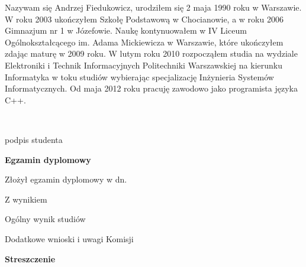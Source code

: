 \begin{titlepage}
    \indent
    Nazywam się Andrzej Fiedukowicz, urodziłem się 2 maja 1990 roku w Warszawie. W roku 2003 ukończyłem Szkołę Podstawową w Chocianowie, a w roku 2006 Gimnazjum nr 1 w Józefowie. Naukę kontynuowałem w IV Liceum Ogólnokształcącego im. Adama Mickiewicza w Warszawie, które ukończyłem zdając maturę w 2009 roku. W lutym roku 2010 rozpocząłem studia na wydziale Elektroniki i Technik Informacyjnych Politechniki Warszawskiej na kierunku Informatyka w toku studiów wybierając specjalizację Inżynieria Systemów Informatycznych. Od maja 2012 roku pracuję zawodowo jako programista języka C++.
    \par
    \vspace{2\baselineskip}
    \hfill\parbox{15em}{{\small\dotfill}\\[-.3ex]
    \centerline{\footnotesize podpis studenta}}\par
    \vspace{3\baselineskip}
    \begin{center}
 	{\large\bfseries Egzamin dyplomowy} \par\bigskip\bigskip
    \end{center}
    \par\noindent\vspace{1.5\baselineskip}
    Złożył egzamin dyplomowy w dn. \dotfill
    \par\noindent\vspace{1.5\baselineskip}
    Z wynikiem \dotfill
    \par\noindent\vspace{1.5\baselineskip}
    Ogólny wynik studiów \dotfill
    \par\noindent\vspace{1.5\baselineskip}
    Dodatkowe wnioski i uwagi Komisji \dotfill
    \par\noindent\vspace{1.5\baselineskip}
    \dotfill

    \newpage\thispagestyle{empty}
    \vspace*{2\baselineskip}
    \begin{center}
	{\large\bfseries Streszczenie}\par\bigskip
    \end{center}


\end{titlepage}

